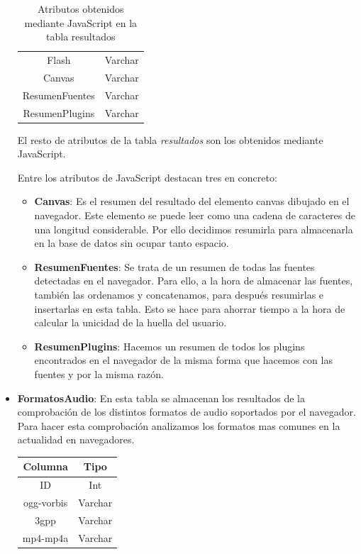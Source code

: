 \begin{itemize}
\begin{table}[H]
\begin{tabular}{c|c}
            Flash & Varchar\\
            Canvas & Varchar\\
            ResumenFuentes & Varchar\\
            ResumenPlugins & Varchar\\
        \end{tabular}
        \caption{Atributos obtenidos mediante JavaScript en la tabla resultados}
        \label{tab:resultadosJavascript}
    \end{table}
    El resto de atributos de la tabla \textit{resultados} son los obtenidos mediante JavaScript.\par
    Entre los atributos de JavaScript destacan tres en concreto:
    \begin{itemize}
        \item \textbf{Canvas}: Es el resumen del resultado del elemento canvas dibujado en el navegador. Este elemento se puede leer como una cadena de caracteres de una longitud considerable. Por ello decidimos resumirla para almacenarla en la base de datos sin ocupar tanto espacio.
        \item \textbf{ResumenFuentes}: Se trata de un resumen de todas las fuentes detectadas en el navegador. Para ello, a la hora de almacenar las fuentes, también las ordenamos y concatenamos, para después resumirlas e insertarlas en esta tabla. Esto se hace para ahorrar tiempo a la hora de calcular la unicidad de la huella del usuario.
        \item \textbf{ResumenPlugins}: Hacemos un resumen de todos los plugins encontrados en el navegador de la misma forma que hacemos con las fuentes y por la misma razón.
    \end{itemize}
    \item \textbf{FormatosAudio}: En esta tabla se almacenan los resultados de la comprobación de los distintos formatos de audio soportados por el navegador. Para hacer esta comprobación analizamos los formatos mas comunes en la actualidad en navegadores.\cite{Formatos} \par
    \begin{table}[H]
        \centering
        \begin{tabular}{c|c}
            Columna & Tipo \\ \hline
            ID & Int\\
            ogg-vorbis & Varchar\\
            3gpp & Varchar\\
            mp4-mp4a & Varchar\\

\end{tabular}
\end{table}
\end{itemize}
